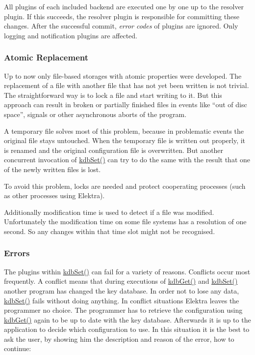 All plugins of each included backend are executed one by one up to the resolver plugin. If this succeeds, the resolver plugin is responsible for committing these changes. After the successful commit, {\itshape error codes} of plugins are ignored. Only logging and notification plugins are affected.

\subsubsection*{Atomic Replacement}

Up to now only file-\/based storages with atomic properties were developed. The replacement of a file with another file that has not yet been written is not trivial. The straightforward way is to lock a file and start writing to it. But this approach can result in broken or partially finished files in events like “out of disc space”, signals or other asynchronous aborts of the program.

A temporary file solves most of this problem, because in problematic events the original file stays untouched. When the temporary file is written out properly, it is renamed and the original configuration file is overwritten. But another concurrent invocation of {\ttfamily \hyperlink{group__kdb_ga11436b058408f83d303ca5e996832bcf}{kdb\+Set()}} can try to do the same with the result that one of the newly written files is lost.

To avoid this problem, locks are needed and protect cooperating processes (such as other processes using Elektra).

Additionally modification time is used to detect if a file was modified. Unfortunately the modification time on some file systems has a resolution of one second. So any changes within that time slot might not be recognised.

\subsubsection*{Errors}

The plugins within {\ttfamily \hyperlink{group__kdb_ga11436b058408f83d303ca5e996832bcf}{kdb\+Set()}} can fail for a variety of reasons. Conflicts occur most frequently. A conflict means that during executions of {\ttfamily \hyperlink{group__kdb_ga28e385fd9cb7ccfe0b2f1ed2f62453a1}{kdb\+Get()}} and {\ttfamily \hyperlink{group__kdb_ga11436b058408f83d303ca5e996832bcf}{kdb\+Set()}} another program has changed the key database. In order not to lose any data, {\ttfamily \hyperlink{group__kdb_ga11436b058408f83d303ca5e996832bcf}{kdb\+Set()}} fails without doing anything. In conflict situations Elektra leaves the programmer no choice. The programmer has to retrieve the configuration using {\ttfamily \hyperlink{group__kdb_ga28e385fd9cb7ccfe0b2f1ed2f62453a1}{kdb\+Get()}} again to be up to date with the key database. Afterwards it is up to the application to decide which configuration to use. In this situation it is the best to ask the user, by showing him the description and reason of the error, how to continue\+:


